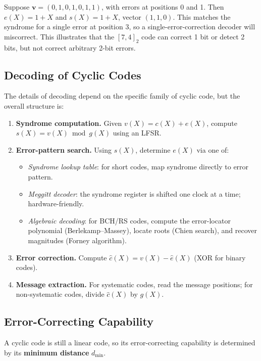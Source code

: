 \begin{example}
Suppose \(\mathbf{v}=(0,1,0,1,0,1,1)\), with errors at positions 0 and 1. Then \(e(X)=1+X\) and \(s(X)=1+X\), vector \((1,1,0)\). This matches the syndrome for a single error at position 3, so a single-error-correction decoder will miscorrect. This illustrates that the \([7,4]_2\) code can correct 1 bit or detect 2 bits, but not correct arbitrary 2-bit errors.
\end{example}

\newpage
\subsection{Decoding of Cyclic Codes}

The details of decoding depend on the specific family of cyclic code, but the overall structure is:

\begin{enumerate}[(1)]
	\item \textbf{Syndrome computation.} Given \(v(X)=c(X)+e(X)\), compute \(s(X)=v(X) \bmod g(X)\) using an LFSR.
	\item \textbf{Error-pattern search.} Using \(s(X)\), determine \(e(X)\) via one of:
	\begin{itemize}
		\item \textit{Syndrome lookup table}: for short codes, map syndrome directly to error pattern.
		\item \textit{Meggitt decoder}: the syndrome register is shifted one clock at a time; hardware-friendly.
		\item \textit{Algebraic decoding}: for BCH/RS codes, compute the error-locator polynomial (Berlekamp--Massey), locate roots (Chien search), and recover magnitudes (Forney algorithm).
	\end{itemize}
	\item \textbf{Error correction.} Compute \(\hat{c}(X)=v(X)-\hat{e}(X)\) (XOR for binary codes).
	\item \textbf{Message extraction.} For systematic codes, read the message positions; for non-systematic codes, divide \(\hat{c}(X)\) by \(g(X)\).
\end{enumerate}

\newpage
\subsection{Error-Correcting Capability}

A cyclic code is still a linear code, so its error-correcting capability is determined by its \textbf{minimum distance} \(d_{\min}\).

